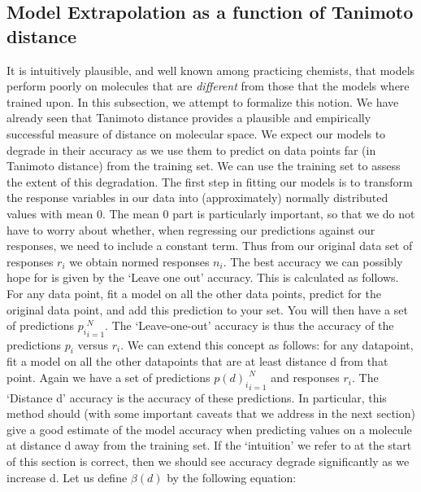 \documentclass[journal=jacsat,manuscript=article]{achemso}
\begin{document}
\subsection*{Model Extrapolation as a function of Tanimoto distance}
It is intuitively plausible, and well known among practicing chemists, that models perform poorly on molecules that are \textit{different} from those that the models where trained upon\cite{et0:}.  In this subsection, we attempt to formalize this notion.  We have already seen that Tanimoto distance provides a plausible and empirically successful measure of distance on molecular space.
\newline
\newline
We expect our models to degrade in their accuracy as we use them to predict on data points far (in Tanimoto distance) from the training set. We can use the training set to assess the extent of this degradation.
\newline
\newline
The first step in fitting our models is to transform the response variables in our data into (approximately) normally distributed values with mean 0. The mean 0 part is particularly important, so that we do not have to worry about whether, when regressing our predictions against our responses, we need to include a constant term.  Thus from our original data set of responses $r_i$ we obtain normed responses $n_i$.
\newline
\newline
The best accuracy we can possibly hope for is given by the `Leave one out' accuracy.  This is calculated as follows.  For any data point, fit a model on all the other data points, predict for the original data point, and add this prediction to your set.  You will then have a set of predictions ${ p_i }_{i = 1}^N$. The `Leave-one-out' accuracy is thus the accuracy of the predictions $p_i$ versus $r_i$.
\newline
\newline
We can extend this concept as follows:  for any datapoint, fit a model on all the other datapoints that are at least distance d from that point.  Again we have a set of predictions ${ p(d)_i }_{i = 1}^N$ and responses $r_i$.  The `Distance d' accuracy is the accuracy of these predictions.  In particular, this method should (with some important caveats that we address in the next section) give a good estimate of the model accuracy when predicting values on a molecule at distance d away from the training set.  If the `intuition' we refer to at the start of this section is correct, then we should see accuracy degrade significantly as we increase d.
\newline
\newline
Let us define $\beta(d)$ by the following equation:
\end{document}
